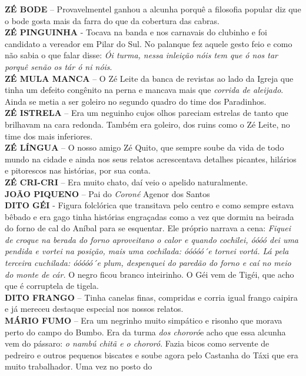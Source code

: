 \documentclass[12pt,brazil,]{book}
\begin{document}
\textbf{ZÉ BODE} -- Provavelmentel ganhou a alcunha porquê a filosofia
popular diz que o bode gosta mais da farra do que da cobertura das
cabras.\\
\textbf{ZÉ PINGUINHA} - Tocava na banda e nos carnavais do clubinho e
foi candidato a vereador em Pilar do Sul. No palanque fez aquele gesto
feio e como não sabia o que falar disse: \emph{Ói turma, nessa inleição
nóis tem que ó nos tar porquê senão os tár ó ni nóis}.\\
\textbf{ZÉ MULA MANCA} -- O Zé Leite da banca de revistas ao lado da
Igreja que tinha um defeito congênito na perna e mancava mais que
\emph{corrida de aleijado}. Ainda se metia a ser goleiro no segundo
quadro do time dos Paradinhos.\\
\textbf{ZÉ ISTRELA} -- Era um neguinho cujos olhos pareciam estrelas de
tanto que brilhavam na cara redonda. Também era goleiro, dos ruins como
o Zé Leite, no time dos mais inferiores.\\
\textbf{ZÉ LÍNGUA} -- O nosso amigo Zé Quito, que sempre soube da vida
de todo mundo na cidade e ainda nos seus relatos acrescentava detalhes
picantes, hilários e pitorescos nas histórias, por sua conta.\\
\textbf{ZÉ CRI-CRI} -- Era muito chato, daí veio o apelido
naturalmente.\\
\textbf{JOÃO PIQUENO} -- Pai do \emph{Coroné} Agenor dos Santos\\
\textbf{DITO GÉI} - Figura folclórica que transitava pelo centro e como
sempre estava bêbado e era gago tinha histórias engraçadas como a vez
que dormiu na beirada do forno de cal do Aníbal para se esquentar. Ele
próprio narrava a cena: \emph{Fiquei de croque na berada do forno
aproveitano o calor e quando cochilei, óóóó dei uma pendida e vortei na
posição, mais uma cochilada: óóóóó´e tornei vortá. Lá pela terceira
cuchilada: óóóóó´e plum, despenquei do paredão do forno e caí no meio do
monte de cár.} O negro ficou branco inteirinho. O Géi vem de Tigéi, que
acho que é corruptela de tigela.\\
\textbf{DITO FRANGO} -- Tinha canelas finas, compridas e corria igual
frango caipira e já mereceu destaque especial nos nossos relatos.\\
\textbf{MÁRIO FUMO} -- Era um negrinho muito simpático e risonho que
morava perto do campo do Bumbo. Era da turma \emph{dos chororó}e acho
que essa alcunha vem do pássaro: \emph{o nambú chitã e o chororó}. Fazia
bicos como servente de pedreiro e outros pequenos biscates e soube agora
pelo Castanha do Táxi que era muito trabalhador. Uma vez no posto do
\end{document}
